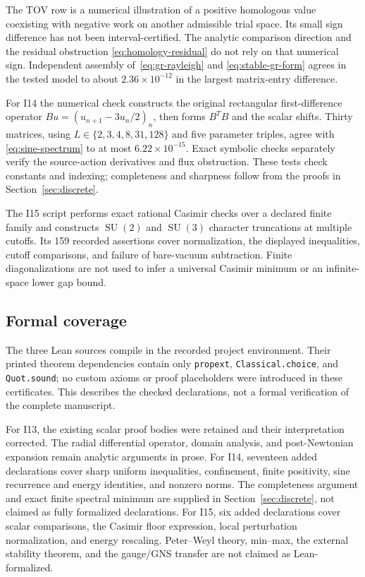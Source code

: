 \documentclass[11pt,letterpaper]{article}
\newcommand{\SU}{\operatorname{SU}}
\theoremstyle{definition}
\numberwithin{equation}{section}
\begin{document}
The TOV row is a numerical illustration of a positive homologous value
coexisting with negative work on another admissible trial space.
Its small sign difference has not been interval-certified. The analytic
comparison direction and the residual obstruction
\eqref{eq:homology-residual} do not rely on that numerical sign.
Independent assembly of~\eqref{eq:gr-rayleigh} and
\eqref{eq:stable-gr-form} agrees in the tested model to about
$2.36\times10^{-12}$ in the largest matrix-entry difference.

For I14 the numerical check constructs the original rectangular
first-difference operator $B u=(u_{n+1}-3u_n/2)_n$, then forms
$B^TB$ and the scalar shifts. Thirty matrices, using
$L\in\{2,3,4,8,31,128\}$ and five parameter triples, agree with
\eqref{eq:sine-spectrum} to at most $6.22\times10^{-15}$. Exact symbolic
checks separately verify the source-action derivatives and flux
obstruction. These tests check constants and indexing; completeness and
sharpness follow from the proofs in Section~\ref{sec:discrete}.

The I15 script performs exact rational Casimir checks over a declared
finite family and constructs $\SU(2)$ and $\SU(3)$ character truncations
at multiple cutoffs. Its 159 recorded assertions cover normalization,
the displayed inequalities, cutoff comparisons, and failure of bare-vacuum
subtraction. Finite diagonalizations are not used to infer a universal
Casimir minimum or an infinite-space lower gap bound.

\subsection{Formal coverage}

The three Lean sources compile in the recorded project environment.
Their printed theorem dependencies contain only \texttt{propext},
\texttt{Classical.choice}, and \texttt{Quot.sound}; no custom axioms or
proof placeholders were introduced in these certificates. This describes
the checked declarations, not a formal verification of the complete
manuscript.

For I13, the existing scalar proof bodies were retained and their
interpretation corrected. The radial differential operator, domain
analysis, and post-Newtonian expansion remain analytic arguments in
prose. For I14, seventeen added declarations cover sharp uniform
inequalities, confinement, finite positivity, sine recurrence and energy
identities, and nonzero norms. The completeness argument and exact
finite spectral minimum are supplied in Section~\ref{sec:discrete}, not
claimed as fully formalized declarations. For I15, six added declarations
cover scalar comparisons, the Casimir floor expression, local perturbation
normalization, and energy rescaling. Peter--Weyl theory, min--max, the
external stability theorem, and the gauge/GNS transfer are not claimed
as Lean-formalized.
\end{document}
